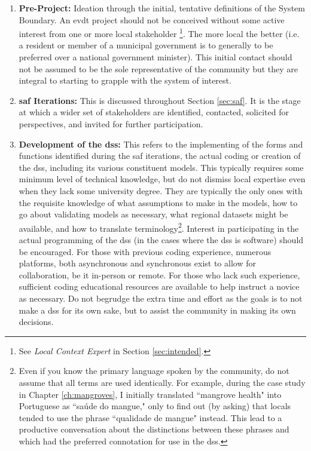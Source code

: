 \begin{enumerate} \setlength{\itemsep}{0pt} \setlength{\parskip}{0pt}
    \item{\textbf{Pre-Project:} Ideation through the initial, tentative definitions of the System Boundary. An \ac{evdt} project should not be conceived without some active interest from one or more local stakeholder \footnote{See \textit{Local Context Expert} in Section \ref{sec:intended}.}.  The more local the better (i.e. a resident or member of a municipal government is to generally to be preferred over a national government minister). This initial contact should not be assumed to be the sole representative of the community but they are integral to starting to grapple with the system of interest.}
	\item{\textbf{\ac{saf} Iterations:} This is discussed throughout Section \ref{sec:saf}. It is the stage at which a wider set of stakeholders are identified, contacted, solicited for perspectives, and invited for further participation.}
	\item{\textbf{Development of the \ac{dss}:} This refers to the implementing of the forms and functions identified during the \ac{saf} iterations, the actual coding or creation of the \ac{dss}, including its various constituent models. This typically requires some minimum level of technical knowledge, but do not dismiss local expertise even when they lack some university degree. They are typically the only ones with the requisite knowledge of what assumptions to make in the models, how to go about validating models as necessary, what regional datasets might be available, and how to translate terminology\footnote{Even if you know the primary language spoken by the community, do not assume that all terms are used identically. For example, during the case study in Chapter \ref{ch:mangroves}, I initially translated ``mangrove health" into Portuguese as ``saúde do mangue," only to find out (by asking) that locals tended to use the phrase ``qualidade de mangue" instead. This lead to a productive conversation about the distinctions between these phrases and which had the preferred connotation for use in the \ac{dss}.}. Interest in participating in the actual programming of the \ac{dss} (in the cases where the \ac{dss} is software) should be encouraged. For those with previous coding experience, numerous platforms, both asynchronous and synchronous exist to allow for collaboration, be it in-person or remote. For those who lack such experience, sufficient coding educational resources are available to help instruct a novice as necessary. Do not begrudge the extra time and effort as the goals is to not make a \ac{dss} for its own sake, but to assist the community in making its own decisions.}

\end{enumerate}
